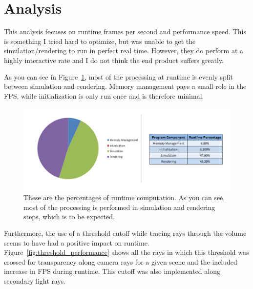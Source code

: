 \documentclass{jcgt}
\begin{document}
\section{Analysis}

This analysis focuses on runtime frames per second and performance speed. This is something
I tried hard to optimize, but was unable to get the simulation/rendering to run in perfect
real time. However, they do perform at a highly interactive rate and I do not think the
end product suffers greatly.

As you can see in Figure~\ref{fig:performance_distribution}, most of the processing at runtime
is evenly split between simulation and rendering. Memory management pays a small role in the
FPS, while initialization is only run once and is therefore minimal.

\begin{figure}[htb]
  \centering
   \includegraphics[width=0.7\columnwidth]{images/Performance.png}
   \caption{\label{fig:performance_distribution}
     These are the percentages of runtime computation. As you can see, most of the processing
     is performed in simulation and rendering steps, which is to be expected.}
\end{figure}

Furthermore, the use of a threshold cutoff while tracing rays through the volume seems
to have had a positive impact on runtime. Figure~\ref{fig:threshold_performance} shows
all the rays in which this threshold was crossed for transparency along camera rays
for a given scene and the included increase in FPS during runtime. This cutoff was also
implemented along secondary light rays.
\end{document}
